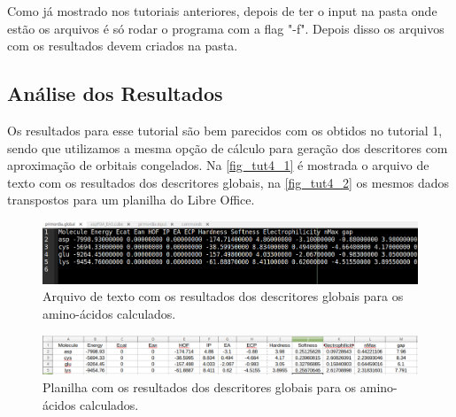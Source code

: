 \documentclass[a4paper,11pt]{refart}
\begin{document}
Como já mostrado nos tutoriais anteriores, depois de ter o input na pasta onde estão os arquivos é só rodar o programa com a flag "-f". Depois disso os arquivos com os resultados devem criados na pasta. 

\subsection{Análise dos Resultados}

Os resultados para esse tutorial são bem parecidos com os obtidos no tutorial 1, sendo que utilizamos a mesma opção de cálculo para geração dos descritores com aproximação de orbitais congelados. Na \autoref{fig_tut4_1} é mostrada o arquivo de texto com os resultados dos descritores globais, na \autoref{fig_tut4_2} os mesmos dados transpostos para um planilha do Libre Office.  

\hspace*{-\leftmarginwidth}
\begin{minipage}{\fullwidth}
	\begin{figure}[H]
		\begin{center}
			\includegraphics[width=6in]{images/tut4_img3}
			\caption{Arquivo de texto com os resultados dos  descritores globais para os amino-ácidos calculados.}
			\label{fig_tut4_1}
		\end{center}
	\end{figure}
\end{minipage}

\hspace*{-\leftmarginwidth}
\begin{minipage}{\fullwidth}
	\begin{figure}[H]
		\begin{center}
			\includegraphics[width=6in]{images/tut4_img4}
			\caption{Planilha com os resultados dos descritores globais para os amino-ácidos calculados.}
			\label{fig_tut4_2}
		\end{center}
	\end{figure}
\end{minipage}
\end{document}
